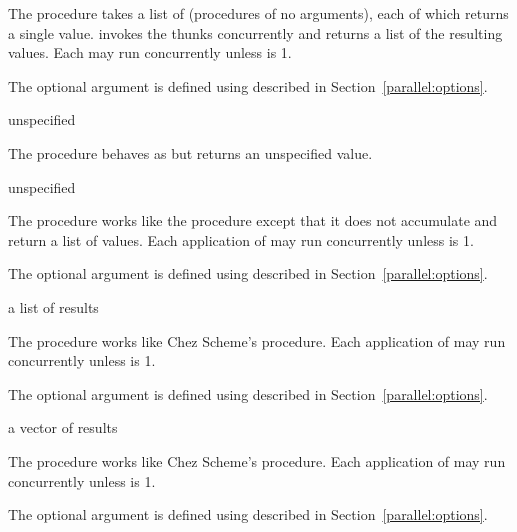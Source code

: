 The  procedure takes a list of 
(procedures of no arguments), each of which returns a single
value.  invokes the thunks concurrently and
returns a list of the resulting values. Each  may run
concurrently unless  is 1.

The optional  argument is defined using
 described in Section~\ref{parallel:options}.

\begin{procedure}
\end{procedure}
\returns{} unspecified

The  procedure behaves as
 but returns an unspecified value.

\begin{procedure}
\end{procedure}
\returns{} unspecified

The  procedure works like the
 procedure except that it does not accumulate and
return a list of values. Each application of  may run
concurrently unless  is 1.

The optional  argument is defined using
 described in Section~\ref{parallel:options}.

\begin{procedure}
\end{procedure}
\returns{} a list of results

The  procedure works like Chez Scheme's 
procedure. Each application of  may run concurrently
unless  is 1.

The optional  argument is defined using
 described in Section~\ref{parallel:options}.

\begin{procedure}
\end{procedure}
\returns{} a vector of results

The  procedure works like Chez Scheme's
 procedure. Each application of  may
run concurrently unless  is 1.

The optional  argument is defined using
 described in Section~\ref{parallel:options}.

